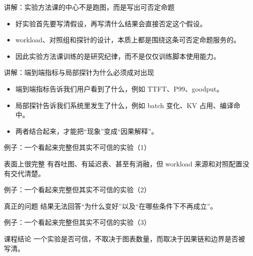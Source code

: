 \begin{frame}{讲解：实验方法课的中心不是跑图，而是写出可否定命题}
  \begin{itemize}
    \item 好实验首先要写清假设，再写清什么结果会直接否定这个假设。
    \item workload、对照组和探针的设计，本质上都是围绕这条可否定命题服务的。
    \item 因此实验方法课训练的是研究纪律，而不是仅仅训练脚本使用能力。
  \end{itemize}
\end{frame}

\begin{frame}{讲解：端到端指标与局部探针为什么必须成对出现}
  \begin{itemize}
    \item 端到端指标告诉我们用户看到了什么，例如 TTFT、P99、goodput。
    \item 局部探针告诉我们系统里发生了什么，例如 batch 变化、KV 占用、编译命中。
    \item 两者结合起来，才能把“现象”变成“因果解释”。
  \end{itemize}
\end{frame}

\begin{frame}{例子：一个看起来完整但其实不可信的实验（1）}
\begin{block}{表面上很完整}
    有吞吐图、有延迟表、甚至有消融，但 workload 来源和对照配置没有交代清楚。
  \end{block}
\end{frame}

\begin{frame}{例子：一个看起来完整但其实不可信的实验（2）}
\begin{block}{真正的问题}
    结果无法回答“为什么变好”以及“在哪些条件下不再成立”。
  \end{block}
\end{frame}

\begin{frame}{例子：一个看起来完整但其实不可信的实验（3）}
\begin{block}{课程结论}
    一个实验是否可信，不取决于图表数量，而取决于因果链和边界是否被写清。
  \end{block}
\end{frame}

